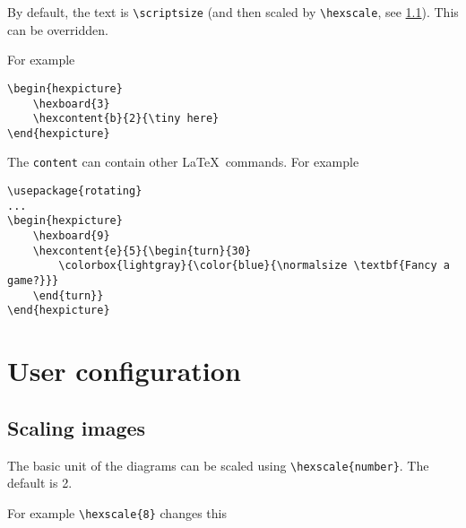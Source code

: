 \documentclass[a4paper,12pt]{article}
\begin{document}
    By default, the text is \verb|\scriptsize| (and then scaled by \verb|\hexscale|, see \ref{scaling}). This can be overridden. 
    
    For example
    
    \begin{verbatim}\begin{hexpicture}
    \hexboard{3}
    \hexcontent{b}{2}{\tiny here}
\end{hexpicture}\end{verbatim}
    
    \begin{hexpicture}
    \end{hexpicture}

    The \verb|content| can contain other \LaTeX\ commands. For example
    
    \begin{verbatim}\usepackage{rotating}
...
\begin{hexpicture}
    \hexboard{9}
    \hexcontent{e}{5}{\begin{turn}{30}
        \colorbox{lightgray}{\color{blue}{\normalsize \textbf{Fancy a game?}}}
    \end{turn}}
\end{hexpicture}\end{verbatim}
    
    
    \begin{hexpicture}
    \end{hexpicture}
    
    \section{User configuration}
    
    \subsection{Scaling images}\label{scaling}
    
    The basic unit of the diagrams can be scaled using \verb|\hexscale{number}|. The default is 2. 
    
    For example \verb|\hexscale{8}| changes this\\
    
\end{document}
